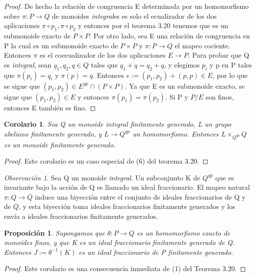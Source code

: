 \documentclass[12pt,spanish]{amsart}
\newtheorem{prop}[Theorem]{Proposición}
\newtheorem{cor}[Theorem]{Corolario}
\theoremstyle{definition}
\theoremstyle{remark}
\newtheorem{obs}[Theorem]{Observación}
\begin{document}
\begin{proof}
De hecho la relación de congruencia E determinada por un homomorfismo sobre $\pi:P \to Q$ de monoides \textit{integral}es es solo el ecualizador de los dos aplicaciones $\pi \circ p_{1},\pi \circ p_{2}$ y entonces por el teorema 3.20 tenemos que es un submonoide exacto de $P\times P$. Por otro lado, sea E una relación de congruencia en P la cual es un submonoide exacto de $P\times P$ y $\pi:P \to Q$ el mapeo cociente. Entonces $\pi$ es el coecualizador de los dos aplicaciones  $E \to P$. Para probar que Q es \textit{integral}, sean $q_{1},q_{2},q\in Q$ tales que $q_{1}+q=q_{2}+q$, y elegimos $p_{i}$ y p en P tales que $\pi(p_{i})=q_{i}$ y $\pi(p)=q$. Entonces $e:=(p_{1},p_{2})+(p,p)\in E$, por lo que se sigue que $(p_{1},p_{2})\in E^{gp}\cap (P\times P)$. Ya que E es un submonoide exacto, se sigue que $(p_{1},p_{2})\in E$ y entonces $\pi(p_{1})=\pi(p_{2})$. Si P y $P/E$ son finos, entonces E también es fino.  
\end{proof}

\begin{cor}
Sea Q un monoide \textit{integral} finitamente generado, L un grupo abeliano finitamente generado, y $L \to Q^{gp}$ un homomorfismo. Entonces $L \times_{Q^{gp}} Q$ es un monoide finitamente generado. 
\end{cor}

\begin{proof}
Este corolario es un caso especial de (6) del teorema 3.20. 
\end{proof}

\begin{obs}
Sea Q un monoide \textit{integral}. Un subconjunto K de $Q^{gp}$ que es invariante bajo la acción de Q es llamado un ideal fraccionario. El mapeo natural $\pi: Q \to \overline{Q}$ induce una biyección entre el conjunto de ideales fraccionarios de Q y de $\overline{Q}$, y esta biyección toma ideales fraccionarios finitamente generados y los envía a ideales fraccionarios finitamente generados. 
\end{obs}

\begin{prop}
Supongamos que $\theta: P  \to Q$ es un homomorfismo exacto de monoides finos, y que K es un ideal fraccionario finitamente generado de Q. Entonces $J:= \theta^{-1}(K)$ es un ideal fraccionario de P finitamente generado.  
\end{prop}

\begin{proof}
Este corolario es una consecuencia inmediata de (1) del Teorema 3.20.
\end{proof}
\end{document}
